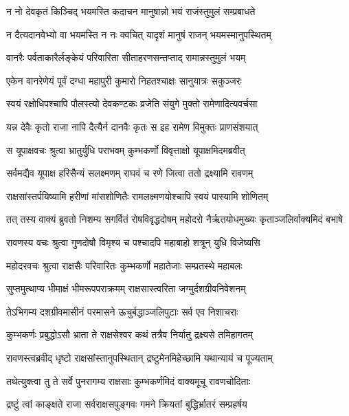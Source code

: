 \twolineshloka
{न नो देवकृतं किञ्चिद् भयमस्ति कदाचन}
{मानुषान्नो भयं राजंस्तुमुलं सम्प्रबाधते} %

\twolineshloka
{न दैत्यदानवेभ्यो वा भयमस्ति न नः क्वचित्}
{यादृशं मानुषं राजन् भयमस्मानुपस्थितम्} %

\twolineshloka
{वानरैः पर्वताकारैर्लङ्केयं परिवारिता}
{सीताहरणसन्तप्ताद् रामान्नस्तुमुलं भयम्} %

\twolineshloka
{एकेन वानरेणेयं पूर्वं दग्धा महापुरी}
{कुमारो निहतश्चाक्षः सानुयात्रः सकुञ्जरः} %

\twolineshloka
{स्वयं रक्षोधिपश्चापि पौलस्त्यो देवकण्टकः}
{व्रजेति संयुगे मुक्तो रामेणादित्यवर्चसा} %

\twolineshloka
{यन्न देवैः कृतो राजा नापि दैत्यैर्न दानवैः}
{कृतः स इह रामेण विमुक्तः प्राणसंशयात्} %

\twolineshloka
{स यूपाक्षवचः श्रुत्वा भ्रातुर्युधि पराभवम्}
{कुम्भकर्णो विवृत्ताक्षो यूपाक्षमिदमब्रवीत्} %

\twolineshloka
{सर्वमद्यैव यूपाक्ष हरिसैन्यं सलक्ष्मणम्}
{राघवं च रणे जित्वा ततो द्रक्ष्यामि रावणम्} %

\twolineshloka
{राक्षसांस्तर्पयिष्यामि हरीणां मांसशोणितैः}
{रामलक्ष्मणयोश्चापि स्वयं पास्यामि शोणितम्} %

\twolineshloka
{तत् तस्य वाक्यं ब्रुवतो निशम्य सगर्वितं रोषविवृद्धदोषम्}
{महोदरो नैर्ऋतयोधमुख्यः कृताञ्जलिर्वाक्यमिदं बभाषे} %

\twolineshloka
{रावणस्य वचः श्रुत्वा गुणदोषौ विमृश्य च}
{पश्चादपि महाबाहो शत्रून् युधि विजेष्यसि} %

\twolineshloka
{महोदरवचः श्रुत्वा राक्षसैः परिवारितः}
{कुम्भकर्णो महातेजाः सम्प्रतस्थे महाबलः} %

\twolineshloka
{सुप्तमुत्थाप्य भीमाक्षं भीमरूपपराक्रमम्}
{राक्षसास्त्वरिता जग्मुर्दशग्रीवनिवेशनम्} %

\twolineshloka
{तेऽभिगम्य दशग्रीवमासीनं परमासने}
{ऊचुर्बद्धाञ्जलिपुटाः सर्व एव निशाचराः} %

\twolineshloka
{कुम्भकर्णः प्रबुद्धोऽसौ भ्राता ते राक्षसेश्वर}
{कथं तत्रैव निर्यातु द्रक्ष्यसे तमिहागतम्} %

\twolineshloka
{रावणस्त्वब्रवीद् धृष्टो राक्षसांस्तानुपस्थितान्}
{द्रष्टुमेनमिहेच्छामि यथान्यायं च पूज्यताम्} %

\twolineshloka
{तथेत्युक्त्वा तु ते सर्वे पुनरागम्य राक्षसाः}
{कुम्भकर्णमिदं वाक्यमूचू रावणचोदिताः} %

\twolineshloka
{द्रष्टुं त्वां काङ्क्षते राजा सर्वराक्षसपुङ्गवः}
{गमने क्रियतां बुद्धिर्भ्रातरं सम्प्रहर्षय} %

